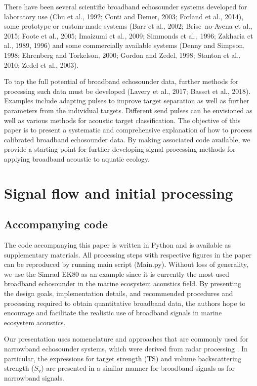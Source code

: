 \documentclass[preprint,12pt,TurnOnLineNumbers]{JASAnew}
\newcommand{\ts}{\textrm{TS}}
\newcommand{\sv}{S_{\textrm{v}}}
\begin{document}
There have been several scientific broadband echosounder systems developed for laboratory use (Chu et al., 1992; Conti and Demer, 2003; Forland et al., 2014), some prototype or custom-made systems (Barr et al., 2002; Brise~no-Avena et al., 2015; Foote et al., 2005; Imaizumi et al., 2009; Simmonds et al., 1996; Zakharia et al., 1989, 1996) and some commercially available systems (Denny and Simpson, 1998; Ehrenberg and Torkelson, 2000; Gordon and Zedel, 1998; Stanton et al., 2010; Zedel et al., 2003). 

To tap the full potential of broadband echosounder data, further methods for processing such data must be developed (Lavery et al., 2017; Basset et al., 2018). Examples include adapting pulses to improve target separation as well as further parameters from the individual targets. Different send pulses can be envisioned as well as various methods for acoustic target classification. The objective of this paper is to present a systematic and comprehensive explanation of how to process calibrated broadband echosounder data. By making associated code available, we provide a starting point for further developing signal processing methods for applying broadband acoustic to aquatic ecology. 

\section{Signal flow and initial processing}

\subsection{Accompanying code}
The code accompanying this paper is written in Python and is available as supplementary materials. All processing steps with respective figures in the paper can be reproduced by running main script (Main.py). Without loss of generality, we use the Simrad EK80 as an example since it is currently the most used broadband echosounder in the marine ecosystem acoustics field. By presenting the design goals, implementation details, and recommended procedures and processing required to obtain quantitative broadband data, the authors hope to encourage and facilitate the realistic use of broadband signals in marine ecosystem acoustics.

Our presentation uses nomenclature and approaches that are commonly used for narrowband echosounder systems, which were derived from radar processing \citep{cook1967}. In particular, the expressions for target strength ($\ts$) and volume backscattering strength ($\sv$) \citep{MacLennan2002consistent} are presented in a similar manner for broadband signals as for narrowband signals.
\end{document}
